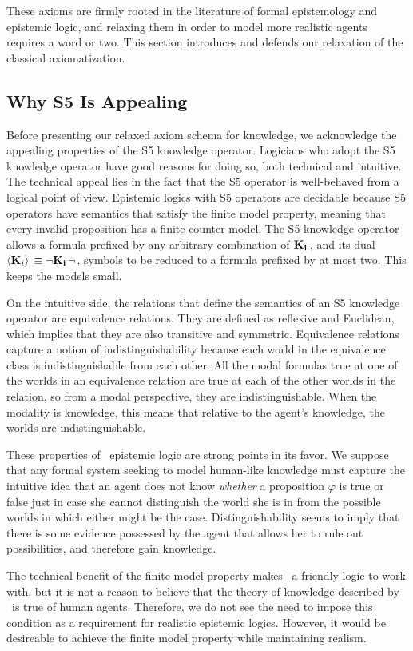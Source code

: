 These axioms are firmly rooted in the literature of formal epistemology and epistemic logic, and relaxing them in order to model more realistic agents requires a word or two. This section introduces and defends our relaxation of the classical axiomatization.

\subsection{Why S5 Is Appealing} 
Before presenting our relaxed axiom schema for knowledge, we acknowledge the appealing properties of the S5 knowledge operator. Logicians who adopt the S5 knowledge operator have good reasons for doing so, both technical and intuitive. The technical appeal lies in the fact that the S5 operator is well-behaved from a logical point of view. Epistemic logics with S5 operators are decidable because S5 operators have semantics that satisfy the finite model property, meaning that every invalid proposition has a finite counter-model. The S5 knowledge operator allows a formula prefixed by any arbitrary combination of $\mathbf{K}_{\mathbf{i}}\,$, and its dual $\langle \mathbf{K}_{i} \rangle\,\equiv{\neg}\mathbf{K}_{\mathbf{i}}\,{\neg}$, symbols to be reduced to a formula prefixed by at most two. This keeps the models small.

On the intuitive side, the relations that define the semantics of an S5 knowledge operator are equivalence relations. They are defined as reflexive and Euclidean, which implies that they are also transitive and symmetric. Equivalence relations capture a notion of indistinguishability because each world in the equivalence class is indistinguishable from each other. All the modal formulas true at one of the worlds in an equivalence relation are true at each of the other worlds in the relation, so from a modal perspective, they are indistinguishable. When the modality is knowledge, this means that relative to the agent's knowledge, the worlds are indistinguishable. 

These properties of \SFive\ epistemic logic are strong points in its favor. We suppose that any formal system seeking to model human-like knowledge must capture the intuitive idea that an agent does not know \emph{whether} a proposition $\varphi$ is true or false just in case she cannot distinguish the world she is in from the possible worlds in which either might be the case. Distinguishability seems to imply that there is some evidence possessed by the agent that allows her to rule out possibilities, and therefore gain knowledge.

The technical benefit of the finite model property makes \SFive\ a friendly logic to work with, but it is not a reason to believe that the theory of knowledge described by \SFive\ is true of human agents. Therefore, we do not see the need to impose this condition as a requirement for realistic epistemic logics. However, it would be desireable to achieve the finite model property while maintaining realism.

